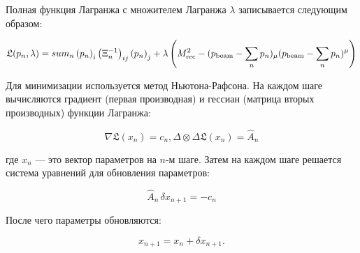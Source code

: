 Полная функция Лагранжа с множителем Лагранжа $\lambda$ записывается следующим образом:

\begin{equation}
    \mathfrak{L}(p_n, \lambda) = 
    sum_n \left( p_{n} \right)_i  \left( \Xi_n^{-1} \right)_{ij}  \left( p_{n} \right)_j + 
    \lambda \left( M_{\text{rec}}^2 - (p_{\text{beam}} - \sum_n p_n)_\mu (p_{\text{beam}} - \sum_n p_n)^\mu \right)
\end{equation}

Для минимизации используется метод Ньютона-Рафсона. На каждом шаге вычисляются градиент (первая производная) и гессиан (матрица вторых производных) функции Лагранжа:

\begin{equation}
    \nabla \mathfrak{L}(x_n) = c_n, \Delta \otimes \Delta \mathfrak{L}(x_n)  = \hat{A}_n
\end{equation}

где $x_n$ — это вектор параметров на $n$-м шаге. Затем на каждом шаге решается система уравнений для обновления параметров:

\begin{equation}
    \hat{A}_n \, \delta x_{n+1} = -c_n
\end{equation}

После чего параметры обновляются:

\begin{equation}
    x_{n+1} = x_n + \delta x_{n+1}.
\end{equation}



